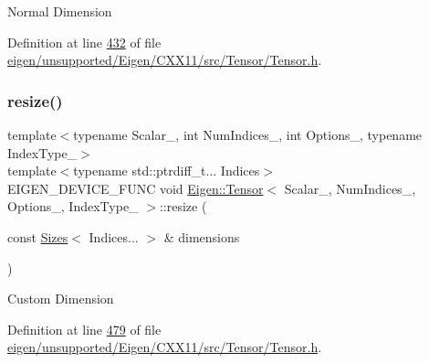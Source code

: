 Normal Dimension 

Definition at line \hyperlink{eigen_2unsupported_2_eigen_2_c_x_x11_2src_2_tensor_2_tensor_8h_source_l00432}{432} of file \hyperlink{eigen_2unsupported_2_eigen_2_c_x_x11_2src_2_tensor_2_tensor_8h_source}{eigen/unsupported/\+Eigen/\+C\+X\+X11/src/\+Tensor/\+Tensor.\+h}.

\mbox{\label{class_eigen_1_1_tensor_a4f637a19784e5d0391882bd9fab0917e}} 
\subsubsection{\texorpdfstring{resize()}{resize()}\hspace{0.1cm}{\footnotesize\ttfamily [3/4]}}
{\footnotesize\ttfamily template$<$typename Scalar\+\_\+, int Num\+Indices\+\_\+, int Options\+\_\+, typename Index\+Type\+\_\+$>$ \\
template$<$typename std\+::ptrdiff\+\_\+t... Indices$>$ \\
E\+I\+G\+E\+N\+\_\+\+D\+E\+V\+I\+C\+E\+\_\+\+F\+U\+NC void \hyperlink{class_eigen_1_1_tensor}{Eigen\+::\+Tensor}$<$ Scalar\+\_\+, Num\+Indices\+\_\+, Options\+\_\+, Index\+Type\+\_\+ $>$\+::resize (\begin{DoxyParamCaption}\item[{const \hyperlink{struct_eigen_1_1_sizes}{Sizes}$<$ Indices... $>$ \&}]{dimensions }\end{DoxyParamCaption})\hspace{0.3cm}{\ttfamily [inline]}}

Custom Dimension 

Definition at line \hyperlink{eigen_2unsupported_2_eigen_2_c_x_x11_2src_2_tensor_2_tensor_8h_source_l00479}{479} of file \hyperlink{eigen_2unsupported_2_eigen_2_c_x_x11_2src_2_tensor_2_tensor_8h_source}{eigen/unsupported/\+Eigen/\+C\+X\+X11/src/\+Tensor/\+Tensor.\+h}.

\mbox{\label{class_eigen_1_1_tensor_a4f637a19784e5d0391882bd9fab0917e}} 
